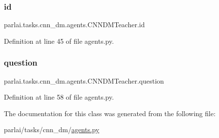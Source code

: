 \subsubsection{\texorpdfstring{id}{id}}
{\footnotesize\ttfamily parlai.\+tasks.\+cnn\+\_\+dm.\+agents.\+C\+N\+N\+D\+M\+Teacher.\+id}



Definition at line 45 of file agents.\+py.

\mbox{\label{classparlai_1_1tasks_1_1cnn__dm_1_1agents_1_1CNNDMTeacher_adabc9a81947bb5e85f132fc7676958e6}} 
\subsubsection{\texorpdfstring{question}{question}}
{\footnotesize\ttfamily parlai.\+tasks.\+cnn\+\_\+dm.\+agents.\+C\+N\+N\+D\+M\+Teacher.\+question}



Definition at line 58 of file agents.\+py.



The documentation for this class was generated from the following file\+:\begin{DoxyCompactItemize}
\item 
parlai/tasks/cnn\+\_\+dm/\hyperlink{parlai_2tasks_2cnn__dm_2agents_8py}{agents.\+py}\end{DoxyCompactItemize}
